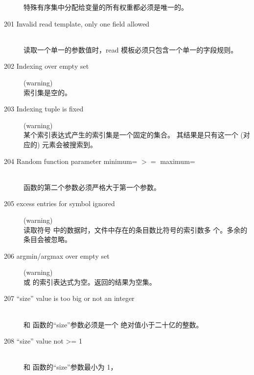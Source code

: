 \begin{description}
  特殊有序集中分配给变量的所有权重都必须是唯一的。
\item[201 Invalid read template, only one field allowed]\ \\
  读取一个单一的参数值时，read 模板必须只包含一个单一的字段规则。
\item[202 Indexing over empty set] (warning)\ \\
  索引集是空的。
\item[203 Indexing tuple is fixed] (warning)\ \\
  某个索引表达式产生的索引集是一个固定的集合。
  其结果是只有这一个 (对应的) 元素会被搜索到。
\item[204 Random function parameter minimum= \code{xxx} $>=$ maximum=
  \code{yyy}]\ \\
   函数的第二个参数必须严格大于第一个参数。
\item[205 \code{xxx} excess entries for symbol \code{yyy} ignored ]
  (warning)\ \\
  读取符号  中的数据时，文件中存在的条目数比符号的索引数多 
   个。多余的条目会被忽略。
\item[206 argmin/argmax over empty set] (warning)\ \\
   或  的索引表达式为空。返回的结果为空集。
\item[207 ``size'' value \code{xxx} is too big or not an integer]\ \\
   和  函数的“size”参数必须是一个
  绝对值小于二十亿的整数。
\item[208 ``size'' value \code{xxx} not >= 1]\ \\
   和  函数的“size”参数最小为 1，

\end{description}
